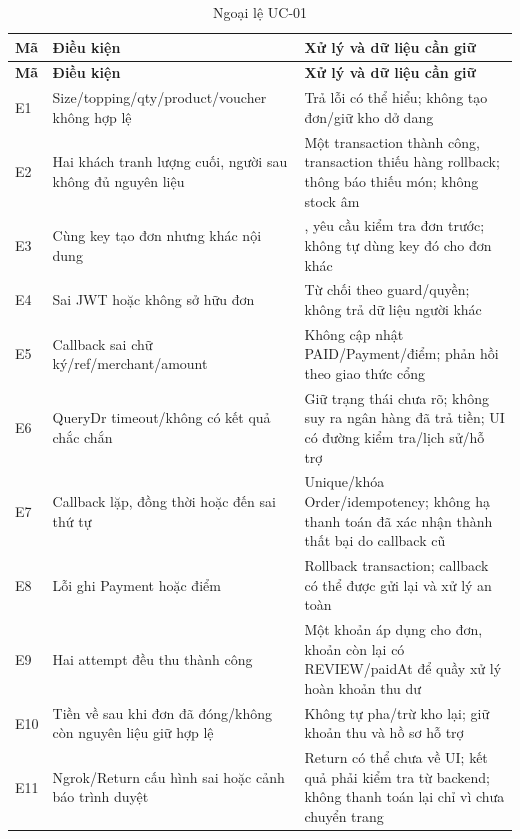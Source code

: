 \begin{longtable}{|>{\raggedright\arraybackslash}p{}|>{\raggedright\arraybackslash}p{}|>{\raggedright\arraybackslash}p{}|}
\caption{Ngoại lệ UC-01}\\\hline
\textbf{Mã} & \textbf{Điều kiện} & \textbf{Xử lý và dữ liệu cần giữ} \\ \hline
\endfirsthead
\hline
\textbf{Mã} & \textbf{Điều kiện} & \textbf{Xử lý và dữ liệu cần giữ} \\ \hline
\endhead
E1 & Size/topping/qty/product/voucher không hợp lệ & Trả lỗi có thể hiểu; không tạo đơn/giữ kho dở dang \\ \hline
E2 & Hai khách tranh lượng cuối, người sau không đủ nguyên liệu & Một transaction thành công, transaction thiếu hàng rollback; thông báo thiếu món; không stock âm \\ \hline
E3 & Cùng key tạo đơn nhưng khác nội dung & 409, yêu cầu kiểm tra đơn trước; không tự dùng key đó cho đơn khác \\ \hline
E4 & Sai JWT hoặc không sở hữu đơn & Từ chối theo guard/quyền; không trả dữ liệu người khác \\ \hline
E5 & Callback sai chữ ký/ref/merchant/amount & Không cập nhật PAID/Payment/điểm; phản hồi theo giao thức cổng \\ \hline
E6 & QueryDr timeout/không có kết quả chắc chắn & Giữ trạng thái chưa rõ; không suy ra ngân hàng đã trả tiền; UI có đường kiểm tra/lịch sử/hỗ trợ \\ \hline
E7 & Callback lặp, đồng thời hoặc đến sai thứ tự & Unique/khóa Order/idempotency; không hạ thanh toán đã xác nhận thành thất bại do callback cũ \\ \hline
E8 & Lỗi ghi Payment hoặc điểm & Rollback transaction; callback có thể được gửi lại và xử lý an toàn \\ \hline
E9 & Hai attempt đều thu thành công & Một khoản áp dụng cho đơn, khoản còn lại có REVIEW/paidAt để quầy xử lý hoàn khoản thu dư \\ \hline
E10 & Tiền về sau khi đơn đã đóng/không còn nguyên liệu giữ hợp lệ & Không tự pha/trừ kho lại; giữ khoản thu và hồ sơ hỗ trợ \\ \hline
E11 & Ngrok/Return cấu hình sai hoặc cảnh báo trình duyệt & Return có thể chưa về UI; kết quả phải kiểm tra từ backend; không thanh toán lại chỉ vì chưa chuyển trang \\ \hline
\end{longtable}
\endgroup
\begingroup\footnotesize\setlength{\tabcolsep}{3pt}
